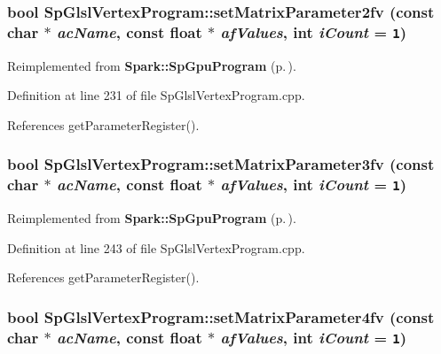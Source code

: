 \subsubsection{\setlength{\rightskip}{0pt plus 5cm}bool Sp\-Glsl\-Vertex\-Program::set\-Matrix\-Parameter2fv (const char $\ast$ {\em ac\-Name}, const float $\ast$ {\em af\-Values}, int {\em i\-Count} = {\tt 1})\hspace{0.3cm}{\tt  [virtual]}}\label{classSpark_1_1SpGlslVertexProgram_a17}




Reimplemented from {\bf Spark::Sp\-Gpu\-Program} {\rm (p.\,\pageref{classSpark_1_1SpGpuProgram_a28})}.

Definition at line 231 of file Sp\-Glsl\-Vertex\-Program.cpp.

References get\-Parameter\-Register().
\subsubsection{\setlength{\rightskip}{0pt plus 5cm}bool Sp\-Glsl\-Vertex\-Program::set\-Matrix\-Parameter3fv (const char $\ast$ {\em ac\-Name}, const float $\ast$ {\em af\-Values}, int {\em i\-Count} = {\tt 1})\hspace{0.3cm}{\tt  [virtual]}}\label{classSpark_1_1SpGlslVertexProgram_a18}




Reimplemented from {\bf Spark::Sp\-Gpu\-Program} {\rm (p.\,\pageref{classSpark_1_1SpGpuProgram_a29})}.

Definition at line 243 of file Sp\-Glsl\-Vertex\-Program.cpp.

References get\-Parameter\-Register().
\subsubsection{\setlength{\rightskip}{0pt plus 5cm}bool Sp\-Glsl\-Vertex\-Program::set\-Matrix\-Parameter4fv (const char $\ast$ {\em ac\-Name}, const float $\ast$ {\em af\-Values}, int {\em i\-Count} = {\tt 1})\hspace{0.3cm}{\tt  [virtual]}}\label{classSpark_1_1SpGlslVertexProgram_a19}




